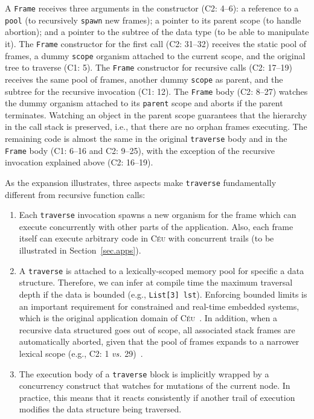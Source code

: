 \documentclass{sig-alternate}
\newcommand{\CEU}{\textsc{C\'{e}u}\xspace}
\newcommand{\code}[1] {{\small{\texttt{#1}}}}
\newcommand{\MM}[1] {\textcircled{\tiny{\textsf{#1}}}}
\begin{document}
A \code{Frame} receives three arguments in the constructor (\MM{C2}: 4--6):
a reference to a \code{pool} (to recursively \code{spawn} new frames);
a pointer to its parent scope (to handle abortion);
and a pointer to the subtree of the data type (to be able to manipulate it).
%
The \code{Frame} constructor for the first call (\MM{C2}: 31--32) receives the 
static pool of frames, a dummy \code{scope} organism attached to the current 
scope, and the original tree to traverse (\MM{C1}: 5).
%
The \code{Frame} constructor for recursive calls (\MM{C2}: 17--19) receives the 
same pool of frames, another dummy \code{scope} as parent, and the 
subtree for the recursive invocation (\MM{C1}: 12).
%
The \code{Frame} body (\MM{C2}: 8--27) watches the dummy organism attached to 
its \code{parent} scope and aborts if the parent terminates.
Watching an object in the parent scope guarantees that the hierarchy in the call stack 
is preserved, i.e., that there are no orphan frames executing.
%
The remaining code is almost the same in the original \code{traverse} body and 
in the \code{Frame} body (\MM{C1}: 6--16 and \MM{C2}: 9--25), with the 
exception of the recursive invocation explained above (\MM{C2}: 16--19).

As the expansion illustrates, three aspects make \code{traverse} fundamentally 
different from recursive function calls:
%
\begin{enumerate}
\item Each \code{traverse} invocation spawns a new organism for the frame which 
can execute concurrently with other parts of the application.
Also, each frame itself can execute arbitrary code in \CEU with concurrent 
trails (to be illustrated in Section~\ref{sec.apps}).
%
\item A \code{traverse} is attached to a lexically-scoped memory pool for 
specific a data structure.
Therefore, we can infer at compile time the maximum traversal depth if the data 
is bounded (e.g., \code{List[3] lst}).
Enforcing bounded limits is an important requirement for constrained and 
real-time embedded systems, which is the original application domain of 
\CEU~\cite{ceu.sensys13}.
In addition, when a recursive data structured goes out of scope, all associated 
stack frames are automatically aborted, given that the pool of frames expands 
to a narrower lexical scope (e.g., \MM{C2}: 1 \emph{vs.} 29)~\cite{ceu.mod15}.
%
\item The execution body of a \code{traverse} block is implicitly wrapped by a 
concurrency construct that watches for mutations of the current node.
In practice, this means that it reacts consistently if another trail of 
execution modifies the data structure being traversed.
\end{enumerate}
\end{document}
